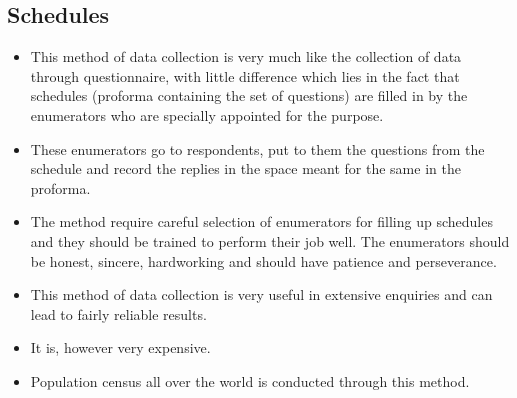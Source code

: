 \documentclass[
10pt, %
a4paper, %
]{report}
\begin{document}
\subsection{Schedules}
\begin{itemize}
\item This method of data collection is very much like the collection of data through questionnaire, with little difference which lies in the fact that schedules (proforma containing the set of questions) are filled in by the enumerators who are specially appointed for the purpose.
\item These enumerators go to respondents, put to them the questions from the schedule and record the replies in the space meant for the same in the proforma.
\item The method require careful selection of enumerators for filling up schedules and they should be trained to perform their job well. The enumerators should be honest, sincere, hardworking and should have patience and perseverance.
\item This method of data collection is very useful in extensive enquiries and can lead to fairly reliable results.
\item It is, however very expensive.
\item Population census all over the world is conducted through this method.
\end{itemize}
\end{document}
